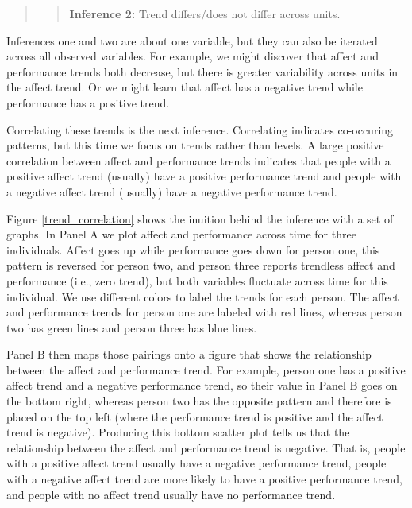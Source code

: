 \documentclass[english,,man]{apa6}
\theoremstyle{definition}
\theoremstyle{definition}
\theoremstyle{definition}
\theoremstyle{remark}
\begin{document}
\begin{quote}
\begin{quote}
\textbf{Inference 2:} Trend differs/does not differ across units.
\end{quote}
\end{quote}

Inferences one and two are about one variable, but they can also be
iterated across all observed variables. For example, we might discover
that affect and performance trends both decrease, but there is greater
variability across units in the affect trend. Or we might learn that
affect has a negative trend while performance has a positive trend.

Correlating these trends is the next inference. Correlating indicates
co-occuring patterns, but this time we focus on trends rather than
levels. A large positive correlation between affect and performance
trends indicates that people with a positive affect trend (usually) have
a positive performance trend and people with a negative affect trend
(usually) have a negative performance trend.

Figure \ref{trend_correlation} shows the inuition behind the inference
with a set of graphs. In Panel A we plot affect and performance across
time for three individuals. Affect goes up while performance goes down
for person one, this pattern is reversed for person two, and person
three reports trendless affect and performance (i.e., zero trend), but
both variables fluctuate across time for this individual. We use
different colors to label the trends for each person. The affect and
performance trends for person one are labeled with red lines, whereas
person two has green lines and person three has blue lines.

Panel B then maps those pairings onto a figure that shows the
relationship between the affect and performance trend. For example,
person one has a positive affect trend and a negative performance trend,
so their value in Panel B goes on the bottom right, whereas person two
has the opposite pattern and therefore is placed on the top left (where
the performance trend is positive and the affect trend is negative).
Producing this bottom scatter plot tells us that the relationship
between the affect and performance trend is negative. That is, people
with a positive affect trend usually have a negative performance trend,
people with a negative affect trend are more likely to have a positive
performance trend, and people with no affect trend usually have no
performance trend.
\end{document}
